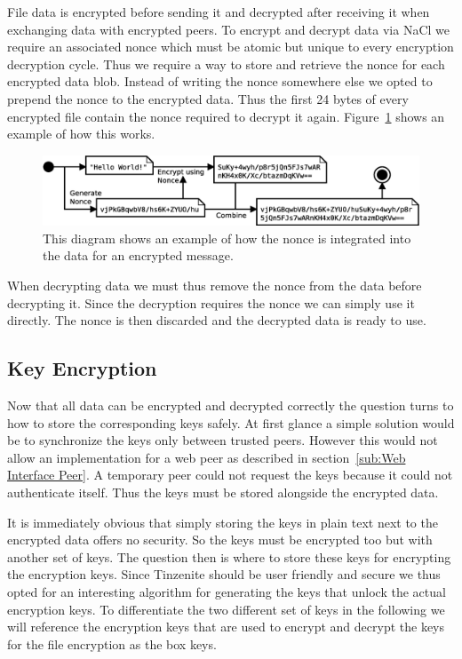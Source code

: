 File data is encrypted before sending it and decrypted after receiving it when exchanging data with encrypted peers.
To encrypt and decrypt data via NaCl we require an associated nonce which must be atomic but unique to every encryption decryption cycle.
Thus we require a way to store and retrieve the nonce for each encrypted data blob.
Instead of writing the nonce somewhere else we opted to prepend the nonce to the encrypted data. %
Thus the first 24 bytes of every encrypted file contain the nonce required to decrypt it again.
Figure~\ref{fig:enc_algo} shows an example of how this works.

\begin{figure}[htp]
\centering
    \includegraphics[width=14cm]{diagram/enc_algo}
\caption[Encryption Example]{This diagram shows an example of how the nonce is integrated into the data for an encrypted message.}
\label{fig:enc_algo}
\end{figure}

When decrypting data we must thus remove the nonce from the data before decrypting it.
Since the decryption requires the nonce we can simply use it directly.
The nonce is then discarded and the decrypted data is ready to use.

\subsection{Key Encryption}
\label{sub:Key Encryption}

Now that all data can be encrypted and decrypted correctly the question turns to how to store the corresponding keys safely.
At first glance a simple solution would be to synchronize the keys only between trusted peers.
However this would not allow an implementation for a web peer as described in section~\ref{sub:Web Interface Peer}.
A temporary peer could not request the keys because it could not authenticate itself.
Thus the keys must be stored alongside the encrypted data.

It is immediately obvious that simply storing the keys in plain text next to the encrypted data offers no security.
So the keys must be encrypted too but with another set of keys.
The question then is where to store these keys for encrypting the encryption keys.
Since Tinzenite should be user friendly and secure we thus opted for an interesting algorithm for generating the keys that unlock the actual encryption keys.
To differentiate the two different set of keys in the following we will reference the encryption keys that are used to encrypt and decrypt the keys for the file encryption as the box keys.

